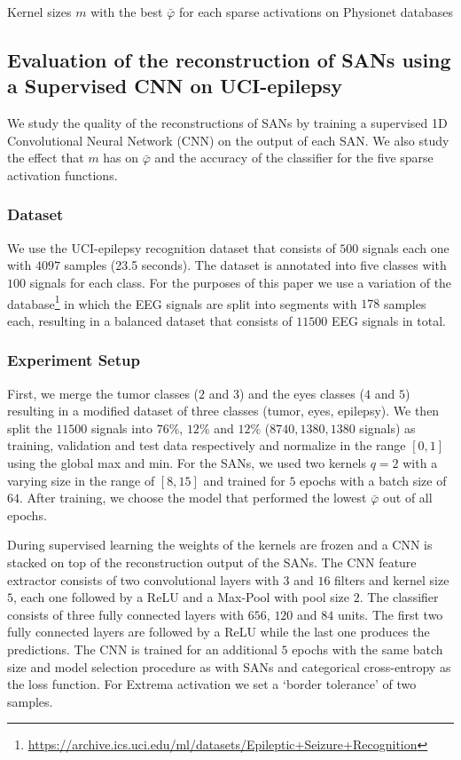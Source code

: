 \documentclass[journal]{IEEEtran}
\begin{document}
\begin{table*}[!t]
	\centering
	\caption{Kernel sizes $m$ with the best $\bar\varphi$ for each sparse activations on Physionet databases}
	\label{table:crrl}
	\setlength\tabcolsep{4pt}
	
\end{table*}

\subsection{Evaluation of the reconstruction of SANs using a Supervised CNN on UCI-epilepsy}
We study the quality of the reconstructions of SANs by training a supervised 1D Convolutional Neural Network (CNN) on the output of each SAN.
We also study the effect that $m$ has on $\bar\varphi$ and the accuracy of the classifier for the five sparse activation functions.

\subsubsection{Dataset}
We use the UCI-epilepsy recognition dataset that consists of $500$ signals each one with $4097$ samples (23.5 seconds).
The dataset is annotated into five classes with $100$ signals for each class.
For the purposes of this paper we use a variation of the database\footnote{\url{https://archive.ics.uci.edu/ml/datasets/Epileptic+Seizure+Recognition}} in which the EEG signals are split into segments with $178$ samples each, resulting in a balanced dataset that consists of $11500$ EEG signals in total.

\subsubsection{Experiment Setup}
First, we merge the tumor classes ($2$ and $3$) and the eyes classes ($4$ and $5$) resulting in a modified dataset of three classes (tumor, eyes, epilepsy).
We then split the $11500$ signals into $76\%$, $12\%$ and $12\%$ ($8740,1380,1380$ signals) as training, validation and test data respectively and normalize in the range $[0, 1]$ using the global max and min.
For the SANs, we used two kernels $q=2$ with a varying size in the range of $[8, 15]$ and trained for $5$ epochs with a batch size of $64$.
After training, we choose the model that performed the lowest $\bar\varphi$ out of all epochs.

During supervised learning the weights of the kernels are frozen and a CNN is stacked on top of the reconstruction output of the SANs.
The CNN feature extractor consists of two convolutional layers with $3$ and $16$ filters and kernel size $5$, each one followed by a ReLU and a Max-Pool with pool size $2$.
The classifier consists of three fully connected layers with $656$, $120$ and $84$ units.
The first two fully connected layers are followed by a ReLU while the last one produces the predictions.
The CNN is trained for an additional $5$ epochs with the same batch size and model selection procedure as with SANs and categorical cross-entropy as the loss function.
For Extrema activation we set a `border tolerance' of two samples.
\end{document}
